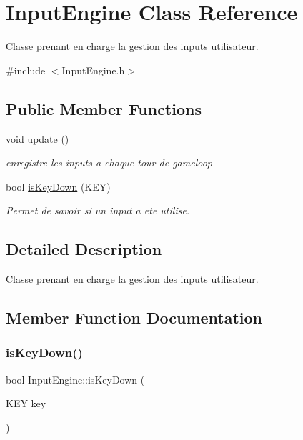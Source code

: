 \hypertarget{class_input_engine}{}\section{Input\+Engine Class Reference}
\label{class_input_engine}


Classe prenant en charge la gestion des inputs utilisateur.  




{\ttfamily \#include $<$Input\+Engine.\+h$>$}

\subsection*{Public Member Functions}
\begin{DoxyCompactItemize}
\item 
\hypertarget{class_input_engine_ab4eacde9d5826d436bc2f62b241f5fd9}{}\label{class_input_engine_ab4eacde9d5826d436bc2f62b241f5fd9} 
void \hyperlink{class_input_engine_ab4eacde9d5826d436bc2f62b241f5fd9}{update} ()
\begin{DoxyCompactList}\small\item\em enregistre les inputs a chaque tour de gameloop \end{DoxyCompactList}\item 
bool \hyperlink{class_input_engine_a83ec547886c948af86305bc9fd576b63}{is\+Key\+Down} (K\+EY)
\begin{DoxyCompactList}\small\item\em Permet de savoir si un input a ete utilise. \end{DoxyCompactList}\end{DoxyCompactItemize}


\subsection{Detailed Description}
Classe prenant en charge la gestion des inputs utilisateur. 

\subsection{Member Function Documentation}
\hypertarget{class_input_engine_a83ec547886c948af86305bc9fd576b63}{}\label{class_input_engine_a83ec547886c948af86305bc9fd576b63} 
\subsubsection{\texorpdfstring{is\+Key\+Down()}{isKeyDown()}}
{\footnotesize\ttfamily bool Input\+Engine\+::is\+Key\+Down (\begin{DoxyParamCaption}\item[{K\+EY}]{key }\end{DoxyParamCaption})}



